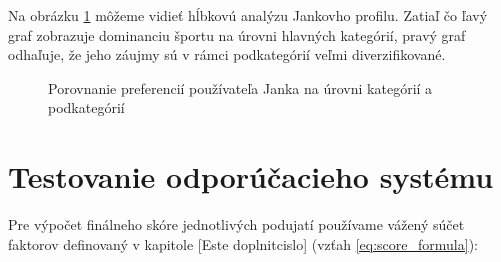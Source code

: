\documentclass[12pt,a4paper]{article}
\begin{document}
Na obrázku \ref{fig:porovnanie_grafov} môžeme vidieť hĺbkovú analýzu Jankovho profilu. Zatiaľ čo ľavý graf zobrazuje dominanciu športu na úrovni hlavných kategórií, pravý graf odhaľuje, že jeho záujmy sú v rámci podkategórií veľmi diverzifikované.

\begin{figure}[H]
\centering

\begin{minipage}{0.48\textwidth}
    \centering
    \caption{Hlavné kategórie}
\end{minipage}
\hfill
\begin{minipage}{0.48\textwidth}
    \centering
    \caption{Podkategórie}
\end{minipage}

\caption{Porovnanie preferencií používateľa Janka na úrovni kategórií a podkategórií}
\label{fig:porovnanie_grafov}
\end{figure}




\section{Testovanie odporúčacieho systému}



Pre výpočet finálneho skóre jednotlivých podujatí používame vážený súčet faktorov definovaný v kapitole [Este doplnitcislo] (vzťah \ref{eq:score_formula}):
\end{document}
